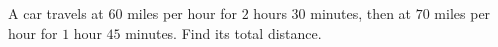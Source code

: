 A car travels at $60$ miles per hour for $2$ hours $30$ minutes, then at $70$ miles per hour for $1$ hour $45$ minutes. Find its total distance.
